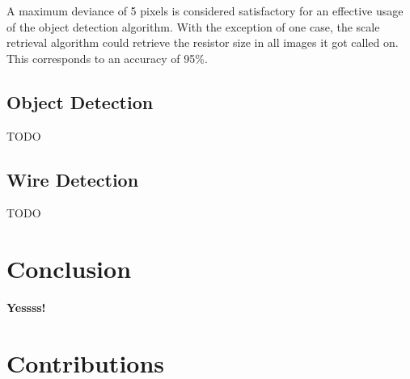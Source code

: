 \documentclass[10pt,twocolumn,letterpaper]{article}
\begin{document}
A maximum deviance of 5 pixels is considered satisfactory for an effective usage of the object detection algorithm. With the exception of one case, the scale retrieval algorithm could retrieve the resistor size in all images it got called on. This corresponds to an accuracy of 95\%.

\subsection{Object Detection}

TODO

\subsection{Wire Detection}

TODO


\section{Conclusion}

\textbf{Yessss!}


\section*{Contributions}
\label{sec:contrib}

\begin{table}[H]
\end{table}
\end{document}
